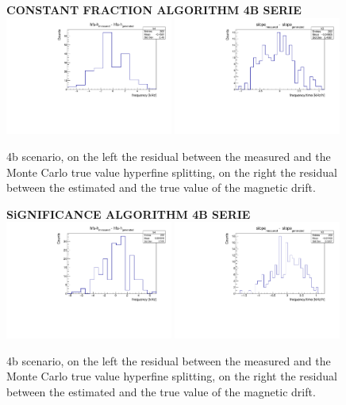 \documentclass[11pt,a4paper,oneside]{article}
\begin{document}
\begin{figure}[hbtp]
\centering
\textbf{CONSTANT FRACTION ALGORITHM 4B SERIE} \vspace{10pt}\\
\includegraphics[width = 0.49\textwidth]{constantfraction/4bmuonONresgasOn.pdf}
\includegraphics[width = 0.49\textwidth]{constantfraction/4bmuonONresgasOn_slope.pdf}
\caption{4b scenario, on the left the residual between the measured and the Monte Carlo true value hyperfine splitting, on the right the residual between the estimated and the true value of the magnetic drift.}
\end{figure}

\begin{figure}[!hbtp]
\centering
\textbf{SiGNIFICANCE ALGORITHM 4B SERIE} \vspace{10pt}\\
\includegraphics[width = 0.49\textwidth]{significance/4bmuonONresgasOn.pdf}
\includegraphics[width = 0.49\textwidth]{significance/4bmuonONresgasOn_slope.pdf}
\caption{4b scenario, on the left the residual between the measured and the Monte Carlo true value hyperfine splitting, on the right the residual between the estimated and the true value of the magnetic drift.}
\end{figure}
\newpage
\end{document}
